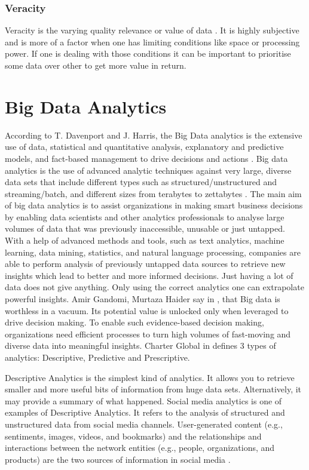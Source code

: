 \documentclass[runningheads]{llncs}
\begin{document}
\subsubsection{Veracity}
Veracity is the varying quality relevance or value of data \cite{FELDMAN}. It is highly subjective and is more of a factor when one has limiting conditions like space or processing power. If one is dealing with those conditions it can be important to prioritise some data over other to get more value in return.

\section{Big Data Analytics}
According to T. Davenport and J. Harris, the Big Data analytics is the extensive use of data, statistical and quantitative analysis, explanatory and predictive models, and fact-based management to drive decisions and actions \cite{DAVBOOK}. Big data analytics is the use of advanced analytic techniques against very large, diverse data sets that include different types such as structured/unstructured and streaming/batch, and different sizes from terabytes to zettabytes \cite{IBM}. The main aim of big data analytics is to assist organizations in making smart business decisions by enabling data scientists and other analytics professionals to analyse large volumes of data that  was previously inaccessible, unusable or just untapped.  With a help of advanced methods and tools, such as text analytics, machine learning, data mining, statistics, and natural language processing, companies are able to perform analysis of previously untapped data sources to retrieve new insights which lead to better and more informed decisions. Just having a lot of data does not give anything. Only using the correct analytics one can extrapolate powerful insights. Amir Gandomi, Murtaza Haider say in \cite{ELS}, that Big data is worthless in a vacuum. Its potential value is unlocked only when leveraged to drive decision making. To enable such evidence-based decision making, organizations need efficient processes to turn high volumes of fast-moving and diverse data into meaningful insights. Charter Global in \cite{CHARTER} defines 3 types of analytics: Descriptive, Predictive and Prescriptive. 

Descriptive Analytics is the simplest kind of analytics. It allows you to retrieve smaller and more useful bits of information from huge data sets. Alternatively, it may provide a summary of what happened. Social media analytics is one of examples of Descriptive Analytics. It refers to the analysis of structured and unstructured data from social media channels. User-generated content (e.g., sentiments, images, videos, and bookmarks) and the relationships and interactions between the network entities (e.g., people, organizations, and products) are the two sources of information in social media \cite{ELS}. 
\end{document}
